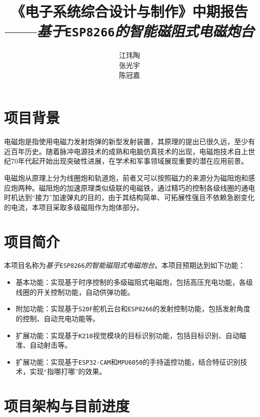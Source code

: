 \documentclass{article}
\title{《电子系统综合设计与制作》中期报告\\——\textit{基于}\texttt{ESP8266}\textit{的智能磁阻式电磁炮台}}
\author{江玮陶\quad 2023010631\\张光宇\quad 2023010629\\陈冠嘉\quad 2023010503}
\begin{document}
\maketitle
\tableofcontents
\section{项目背景}
电磁炮是指使用电磁力发射炮弹的新型发射装置，其原理的提出已很久远，至少有近百年历史。随着脉冲电源技术的成熟和电脑仿真技术的出现，电磁炮技术自上世纪70年代起开始出现突破性进展，在学术和军事领域展现重要的潜在应用前景。

电磁炮从原理上分为线圈炮和轨道炮，前者又可以按照磁力的来源分为磁阻炮和感应炮两种。磁阻炮的加速原理类似级联的电磁铁，通过精巧的控制各级线圈的通电时机达到“接力”加速弹丸的目的，由于其结构简单、可拓展性强且不依赖急剧变化的电流，本项目采取多级磁阻作为炮体部分。
\section{项目简介}
本项目名称为\textit{基于}\texttt{ESP8266}\textit{的智能磁阻式电磁炮台}。本项目预期达到如下功能：
\begin{itemize}
    \item 基本功能：实现基于时序控制的多级磁阻式电磁炮，包括高压充电功能，各级线圈的开关控制功能，自动供弹功能。
    \item 附加功能：实现基于\texttt{S20F}舵机云台和\texttt{ESP8266}的发射控制功能，包括发射角度的控制、自动充电功能等。
    \item 扩展功能：实现基于\texttt{K210}视觉模块的目标识别功能，包括目标识别、自动瞄准、自动射击等。
    \item 扩展功能：实现基于\texttt{ESP32-CAM}和\texttt{MPU6050}的手持遥控功能，结合特征识别技术，实现“指哪打哪”的效果。
\end{itemize}
\section{项目架构与目前进度}
\end{document}
